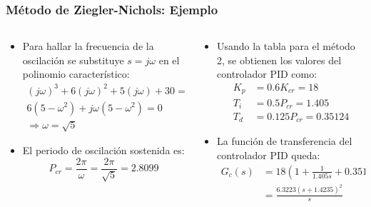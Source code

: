 \documentclass[aspectratio=169,handout]{beamer}
\theoremstyle{definition}
\theoremstyle{plain}
\theoremstyle{remark}
\begin{document}
\begin{frame}[<+->]\frametitle{Método de Ziegler-Nichols: Ejemplo}
\begin{columns}
\begin{column}{0.5\textwidth}
\small
\begin{itemize}
	\item Para hallar la frecuencia de la oscilación se substituye $s = j\omega$ en el polinomio característico:
	\begin{align*}
		(j\omega)^3 + 6(j\omega)^2 + 5(j\omega) + 30 = 0\\
		6(5 - \omega^2) + j\omega(5-\omega^2) = 0\\
		\Rightarrow \omega = \sqrt{5}
	\end{align*}
	\item El periodo de oscilación sostenida es:
	\begin{equation*}
		P_{cr} = \frac{2\pi}{\omega} = \frac{2\pi}{\sqrt{5}} = 2.8099
	\end{equation*}
\end{itemize}
\end{column}
\begin{column}{0.5\textwidth}
\small
\begin{itemize}
	\item Usando la tabla para el método 2, se obtienen los valores del controlador PID como:
	\begin{align*}
		K_p &= 0.6 K_{cr} = 18\\
		T_i &= 0.5 P_{cr} = 1.405\\
		T_d &= 0.125P_{cr} = 0.35124
	\end{align*}
	\item La función de transferencia del controlador PID queda:
	\begin{align*}
		G_c(s) &= 18 \left( 1 + \frac{1}{1.405s} + 0.35124 s \right)\\
		&= \frac{6.3223(s+1.4235)^2}{s}
	\end{align*}
\end{itemize}
\end{column}
\end{columns}
\end{frame}
\end{document}
